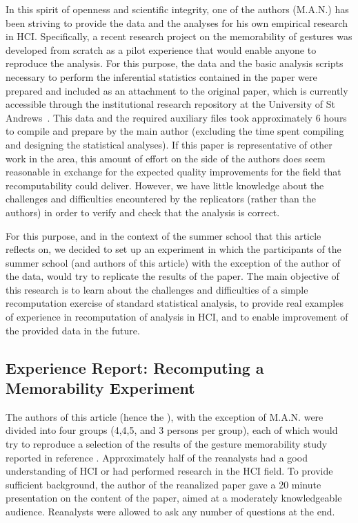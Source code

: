In this spirit of openness and scientific integrity, one of the authors (M.A.N.) has been striving to provide the data and the analyses for his own empirical research in HCI. Specifically, a recent research project on the memorability of gestures \cite{Nacenta:memorability} was developed from scratch as a pilot experience that would enable anyone to reproduce the analysis. For this purpose, the data and the basic analysis scripts necessary to perform the inferential statistics contained in the paper were prepared and included as an attachment to the original paper, which is currently accessible through the institutional research repository at the University of St Andrews~\cite{Nacenta:memorability_data}. This data and the required auxiliary files took approximately 6 hours to compile and prepare by the main author (excluding the time spent compiling and designing the statistical analyses). If this paper is representative of other work in the area, this amount of effort on the side of the authors does seem reasonable in exchange for the expected quality improvements for the field that recomputability could deliver. However, we have little knowledge about the challenges and difficulties encountered by the replicators (rather than the authors) in order to verify and check that the analysis is correct.

For this purpose, and in the context of the summer school that this article reflects on, we decided to set up an experiment in which the participants of the summer school (and authors of this article) with the exception of the author of the data, would try to replicate the results of the paper. The main objective of this research is to learn about the challenges and difficulties of a simple recomputation exercise of standard statistical analysis, to provide real examples of experience in recomputation of analysis in HCI, and to enable improvement of the provided data in the future.

\subsection{Experience Report: Recomputing a Memorability Experiment}
The authors of this article (hence the ), with the exception of M.A.N. were divided into four groups (4,4,5, and 3 persons per group), each of which would try to reproduce a selection of the results of the gesture memorability study reported in reference \cite{Nacenta:memorability}. Approximately half of the reanalysts had a good understanding of HCI or had performed research in the HCI field. To provide sufficient background, the author of the reanalized paper gave a 20 minute presentation on the content of the paper, aimed at a moderately knowledgeable audience. Reanalysts were allowed to ask any number of questions at the end.

